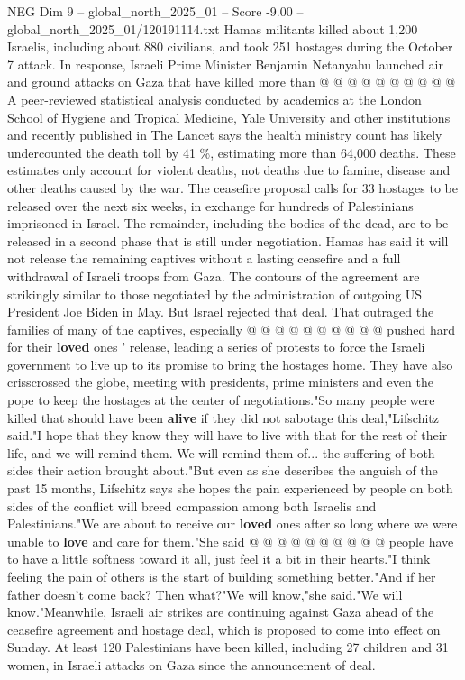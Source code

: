 \begin{textsample}{NEG Dim 9 – global\_north\_2025\_01 – Score -9.00 – global\_north\_2025\_01/120191114.txt}
Hamas militants killed about 1,200 Israelis, including about 880 civilians, and took 251 hostages during the October 7 attack.
In response, Israeli Prime Minister Benjamin Netanyahu launched air and ground attacks on Gaza that have killed more than @ @ @ @ @ @ @ @ @ @ A peer-reviewed statistical analysis conducted by academics at the London School of Hygiene and Tropical Medicine, Yale University and other institutions and recently published in The Lancet says the health ministry count has likely undercounted the death toll by 41 \%, estimating more than 64,000 deaths.
These estimates only account for violent deaths, not deaths due to famine, disease and other deaths caused by the war.
The ceasefire proposal calls for 33 hostages to be released over the next six weeks, in exchange for hundreds of Palestinians imprisoned in Israel.
The remainder, including the bodies of the dead, are to be released in a second phase that is still under negotiation.
Hamas has said it will not release the remaining captives without a lasting ceasefire and a full withdrawal of Israeli troops from Gaza.
The contours of the agreement are strikingly similar to those negotiated by the administration of outgoing US President Joe Biden in May.
But Israel rejected that deal.
That outraged the families of many of the captives, especially @ @ @ @ @ @ @ @ @ @ pushed hard for their \textbf{loved} ones ' release, leading a series of protests to force the Israeli government to live up to its promise to bring the hostages home.
They have also crisscrossed the globe, meeting with presidents, prime ministers and even the pope to keep the hostages at the center of negotiations."So many people were killed that should have been \textbf{alive} if they did not sabotage this deal,"Lifschitz said."I hope that they know they will have to live with that for the rest of their life, and we will remind them.
We will remind them of... the suffering of both sides their action brought about."But even as she describes the anguish of the past 15 months, Lifschitz says she hopes the pain experienced by people on both sides of the conflict will breed compassion among both Israelis and Palestinians."We are about to receive our \textbf{loved} ones after so long where we were unable to \textbf{love} and care for them."She said @ @ @ @ @ @ @ @ @ @ people have to have a little softness toward it all, just feel it a bit in their hearts."I think feeling the pain of others is the start of building something better."And if her father doesn't come back?
Then what?"We will know,"she said."We will know."Meanwhile, Israeli air strikes are continuing against Gaza ahead of the ceasefire agreement and hostage deal, which is proposed to come into effect on Sunday.
At least 120 Palestinians have been killed, including 27 children and 31 women, in Israeli attacks on Gaza since the announcement of deal.

\end{textsample}
